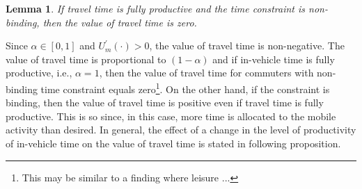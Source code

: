 \documentclass[12pt,a4paper,british]{article}
\newtheorem{lemma}{Lemma}[section]
\begin{document}

\begin{lemma}
If travel time is fully productive and the time constraint is non-binding, then the value of travel time is zero.
\end{lemma}


Since $\alpha \in \left[0, 1 \right]$ and $U_{m}^{\prime}\left( \cdot \right) > 0$, the value of travel time is non-negative. The value of travel time is proportional to $\left( 1 - \alpha \right)$ and if in-vehicle time is fully productive, i.e., $\alpha=1$,  then the value of travel time for commuters with non-binding time constraint equals zero\footnote{This may be similar to a finding where leisure ... }. On the other hand, if the constraint is binding, then the value of travel time is positive even if travel time is fully productive. This is so since, in this case, more time is allocated to the mobile activity than desired. In general, the effect of a change in the level of productivity of in-vehicle time on the value of travel time is stated in following proposition. 



\end{document}
